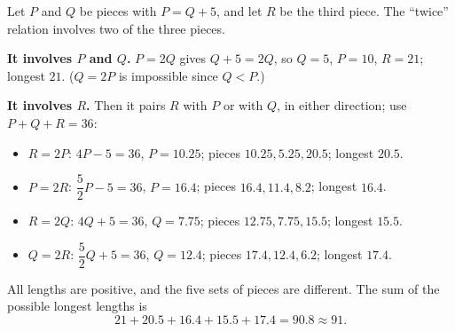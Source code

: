 Let $P$ and $Q$ be pieces with $P=Q+5$, and let $R$ be the third piece. The ``twice'' relation involves two of the three pieces.

\textbf{It involves $P$ and $Q$.} $P=2Q$ gives $Q+5=2Q$, so $Q=5$, $P=10$, $R=21$; longest $21$. ($Q=2P$ is impossible since $Q<P$.)

\textbf{It involves $R$.} Then it pairs $R$ with $P$ or with $Q$, in either direction; use $P+Q+R=36$:
\begin{itemize}
\item $R=2P$: $4P-5=36$, $P=10.25$; pieces $10.25,5.25,20.5$; longest $20.5$.
\item $P=2R$: $\dfrac52P-5=36$, $P=16.4$; pieces $16.4,11.4,8.2$; longest $16.4$.
\item $R=2Q$: $4Q+5=36$, $Q=7.75$; pieces $12.75,7.75,15.5$; longest $15.5$.
\item $Q=2R$: $\dfrac52Q+5=36$, $Q=12.4$; pieces $17.4,12.4,6.2$; longest $17.4$.
\end{itemize}
All lengths are positive, and the five sets of pieces are different. The sum of the possible longest lengths is
\[21+20.5+16.4+15.5+17.4=90.8\approx\boxed{91}.\]
